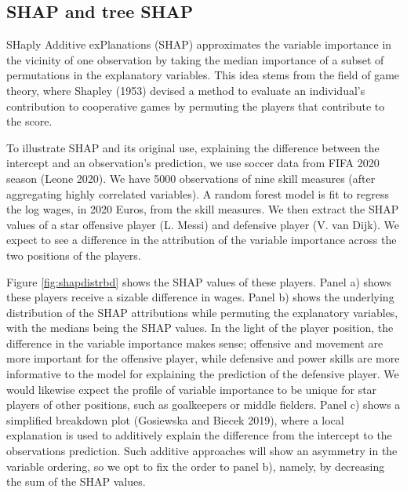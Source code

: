 \documentclass[
  article]{article}
\begin{document}
\hypertarget{shap-and-tree-shap}{%
\subsection{SHAP and tree SHAP}\label{shap-and-tree-shap}}

SHaply Additive exPlanations (SHAP) approximates the variable importance in the vicinity of one observation by taking the median importance of a subset of permutations in the explanatory variables. This idea stems from the field of game theory, where Shapley (1953) devised a method to evaluate an individual's contribution to cooperative games by permuting the players that contribute to the score.

To illustrate SHAP and its original use, explaining the difference between the intercept and an observation's prediction, we use soccer data from FIFA 2020 season (Leone 2020). We have 5000 observations of nine skill measures (after aggregating highly correlated variables). A random forest model is fit to regress the log wages, in 2020 Euros, from the skill measures. We then extract the SHAP values of a star offensive player (L. Messi) and defensive player (V. van Dijk). We expect to see a difference in the attribution of the variable importance across the two positions of the players.

Figure \ref{fig:shapdistrbd} shows the SHAP values of these players. Panel a) shows these players receive a sizable difference in wages. Panel b) shows the underlying distribution of the SHAP attributions while permuting the explanatory variables, with the medians being the SHAP values. In the light of the player position, the difference in the variable importance makes sense; offensive and movement are more important for the offensive player, while defensive and power skills are more informative to the model for explaining the prediction of the defensive player. We would likewise expect the profile of variable importance to be unique for star players of other positions, such as goalkeepers or middle fielders. Panel c) shows a simplified breakdown plot (Gosiewska and Biecek 2019), where a local explanation is used to additively explain the difference from the intercept to the observations prediction. Such additive approaches will show an asymmetry in the variable ordering, so we opt to fix the order to panel b), namely, by decreasing the sum of the SHAP values.
\end{document}
